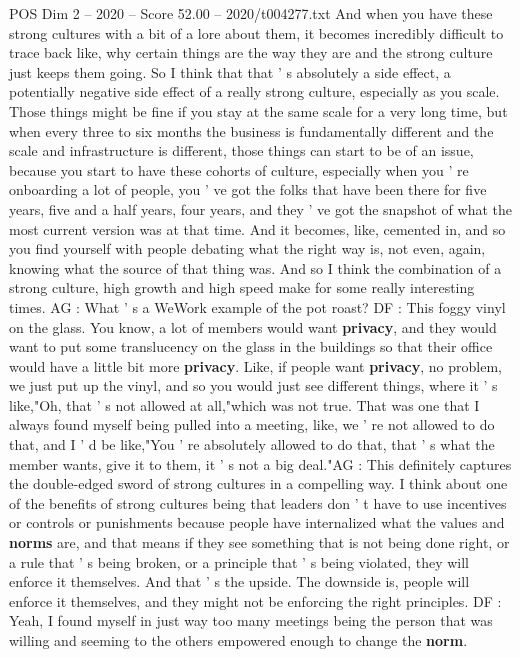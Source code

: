 \begin{textsample}{POS Dim 2 – 2020 – Score 52.00 – 2020/t004277.txt}
And when you have these strong cultures with a bit of a lore about them, it becomes incredibly difficult to trace back like, why certain things are the way they are and the strong culture just keeps them going.
So I think that that ' s absolutely a side effect, a potentially negative side effect of a really strong culture, especially as you scale.
Those things might be fine if you stay at the same scale for a very long time, but when every three to six months the business is fundamentally different and the scale and infrastructure is different, those things can start to be of an issue, because you start to have these cohorts of culture, especially when you ' re onboarding a lot of people, you ' ve got the folks that have been there for five years, five and a half years, four years, and they ' ve got the snapshot of what the most current version was at that time.
And it becomes, like, cemented in, and so you find yourself with people debating what the right way is, not even, again, knowing what the source of that thing was.
And so I think the combination of a strong culture, high growth and high speed make for some really interesting times.
AG : What ' s a WeWork example of the pot roast?
DF : This foggy vinyl on the glass.
You know, a lot of members would want \textbf{privacy}, and they would want to put some translucency on the glass in the buildings so that their office would have a little bit more \textbf{privacy}.
Like, if people want \textbf{privacy}, no problem, we just put up the vinyl, and so you would just see different things, where it ' s like,"Oh, that ' s not allowed at all,"which was not true.
That was one that I always found myself being pulled into a meeting, like, we ' re not allowed to do that, and I ' d be like,"You ' re absolutely allowed to do that, that ' s what the member wants, give it to them, it ' s not a big deal."AG : This definitely captures the double-edged sword of strong cultures in a compelling way.
I think about one of the benefits of strong cultures being that leaders don ' t have to use incentives or controls or punishments because people have internalized what the values and \textbf{norms} are, and that means if they see something that is not being done right, or a rule that ' s being broken, or a principle that ' s being violated, they will enforce it themselves.
And that ' s the upside.
The downside is, people will enforce it themselves, and they might not be enforcing the right principles.
DF : Yeah, I found myself in just way too many meetings being the person that was willing and seeming to the others empowered enough to change the \textbf{norm}.

\end{textsample}
